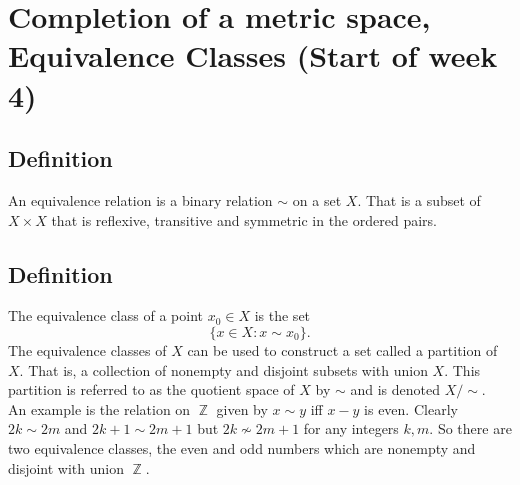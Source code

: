 \documentclass{article}
\DeclareMathOperator\Z{\mathbb{Z}}
\begin{document}
\section*{Completion of a metric space, Equivalence Classes (Start of week 4)}
\subsection*{Definition}
An equivalence relation is a binary relation $\sim$ on a set $X$. That is a subset of $X \times X$ that is reflexive, transitive and symmetric in the ordered pairs.
\subsection*{Definition}
The equivalence class of a point $x_0 \in X$ is the set
$$
\{x \in X: x \sim x_0 \}.
$$
The equivalence classes of $X$ can be used to construct a set called a partition of $X$.
That is, a collection of nonempty and disjoint subsets with union $X$. This partition is referred to as the quotient space of $X$ by $\sim$ and is denoted $X \slash \sim$. \\ \newline
An example is the relation on $\Z$ given by $x \sim y$ iff $x-y$ is even.
Clearly $2k \sim 2m$ and $2k+1 \sim 2m+1$ but $2k \not \sim 2m+1$ for
any integers $k,m$.
So there are two equivalence classes, the even and odd numbers
which are nonempty and disjoint with union $\Z$.
\end{document}
